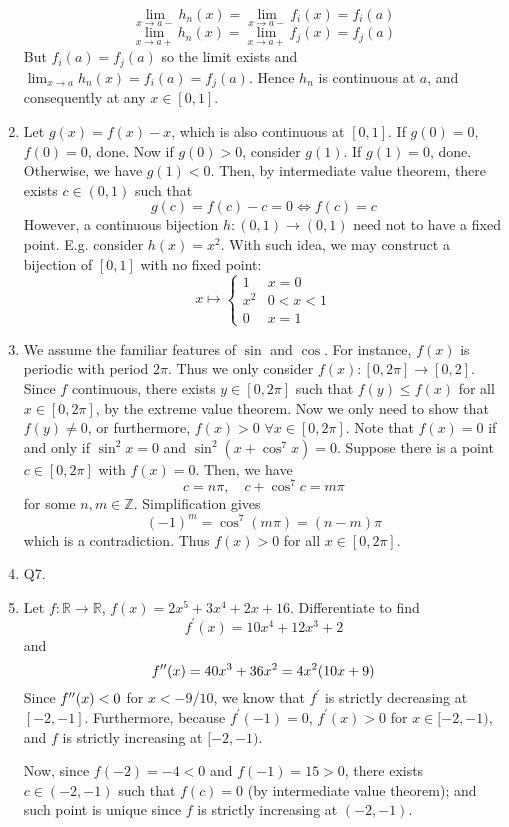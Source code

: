 \documentclass[10pt, a4paper, twoside]{report}
\begin{document}
\begin{enumerate}[{1.}]
    \[\lim_{x\to a-}h_n(x)=\lim_{x\to a-}f_i(x)=f_i(a)\]
    \[\lim_{x\to a+}h_n(x)=\lim_{x\to a+}f_j(x)=f_j(a)\]
    But \(f_i(a)=f_j(a)\) so the limit exists and \(\lim_{x\to a}h_n(x)=f_i(a)=f_j(a)\). Hence \(h_n\) is continuous at \(a\), and consequently at any \(x\in[0,1]\).
    \item Let \(g(x)=f(x)-x\), which is also continuous at \([0,1]\). If \(g(0)=0\), \(f(0)=0\), done. Now if \(g(0)>0\), consider \(g(1)\). If \(g(1)=0\), done. Otherwise, we have \(g(1)<0\). Then, by intermediate value theorem, there exists \(c\in(0,1)\) such that 
    \[g(c)=f(c)-c=0\Leftrightarrow f(c)=c\]
    However, a continuous bijection \(h:(0,1)\to(0,1)\) need not to have a fixed point. E.g. consider \(h(x)=x^2\). With such idea, we may construct a bijection of \([0,1]\) with no fixed point:
    \[x\mapsto \begin{cases}
        1 & x=0 \\
        x^2 & 0<x<1 \\
        0 & x=1
    \end{cases}\]
    \item We assume the familiar features of \(\sin\) and \(\cos\). For instance, \(f(x)\) is periodic with period \(2\pi\). Thus we only consider \(f(x):[0,2\pi]\to[0,2]\). Since \(f\) continuous, there exists \(y\in[0,2\pi]\) such that \(f(y)\leq f(x)\) for all \(x\in[0,2\pi]\), by the extreme value theorem. Now we only need to show that \(f(y)\neq 0\), or furthermore, \(f(x)>0\) \(\forall x\in[0,2\pi]\). Note that \(f(x)=0\) if and only if \(\sin^2x=0\) and \(\sin^2(x+\cos^7x)=0\). Suppose there is a point \(c\in[0,2\pi]\) with \(f(x)=0\). Then, we have
    \[c=n\pi,\quad c+\cos^7c=m\pi\]
    for some \(n,m\in\mathbb{Z}\). Simplification gives
    \[(-1)^m=\cos^7(m\pi)=(n-m)\pi\]
    which is a contradiction. Thus \(f(x)>0\) for all \(x\in[0,2\pi]\).
    \item Q7.
    \item Let \(f:\mathbb{R}\to\mathbb{R}\), \(f(x)=2x^5+3x^4+2x+16\). Differentiate to find 
    \[f^\prime(x)=10x^4+12x^3+2\]
    and 
    \[f^{\prime\prime}(x)=40x^3+36x^2=4x^2(10x+9)\]
    Since \(f^{\prime\prime}(x)<0\) for \(x<-9/10\), we know that \(f^\prime\) is strictly decreasing at \([-2,-1]\). Furthermore, because \(f^\prime(-1)=0\), \(f^\prime(x)> 0\) for \(x\in[-2,-1)\), and \(f\) is strictly increasing at \([-2,-1)\). 
    
    Now, since \(f(-2)=-4<0\) and \(f(-1)=15>0\), there exists \(c\in(-2,-1)\) such that \(f(c)=0\) (by intermediate value theorem); and such point is unique since \(f\) is strictly increasing at \((-2,-1)\). 


\end{enumerate}
\end{document}
